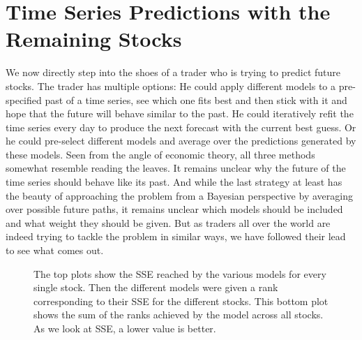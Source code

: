 
\section{Time Series Predictions with the Remaining Stocks}

We now directly step into the shoes of a trader who is trying to  predict future stocks. The trader has multiple options: He could apply different models to a pre-specified past of a time series, see which one fits best and then stick with it and hope that the future will behave similar to the past. He could iteratively refit the time series every day to produce the next forecast with the current best guess. Or he could pre-select different models and average over the predictions generated by these models. Seen from the angle of economic theory, all three methods somewhat resemble reading the leaves. It remains unclear why the future of the time series should behave like its past. And while the last strategy at least has the beauty of approaching the problem from a Bayesian perspective by averaging over possible future paths, it remains unclear which models should be included and what weight they should be given. But as traders all over the world are indeed trying to tackle the problem in similar ways, we have followed their lead to see what comes out. 

\begin{figure}[h]
    \centering
    \begin{adjustbox}{width = 0.95\linewidth}
    
    \end{adjustbox}
    \vspace{1ex}
    \begin{adjustbox}{width = 0.95\linewidth}
    
    \end{adjustbox}
    \caption{The top plots show the SSE reached by the various models for every single stock. Then the different models were given a rank corresponding to their SSE for the different stocks. This bottom plot shows the sum of the ranks achieved by the model across all stocks. As we look at SSE, a lower value is better.}
    \label{fig:models_ranked}
\end{figure}{}

